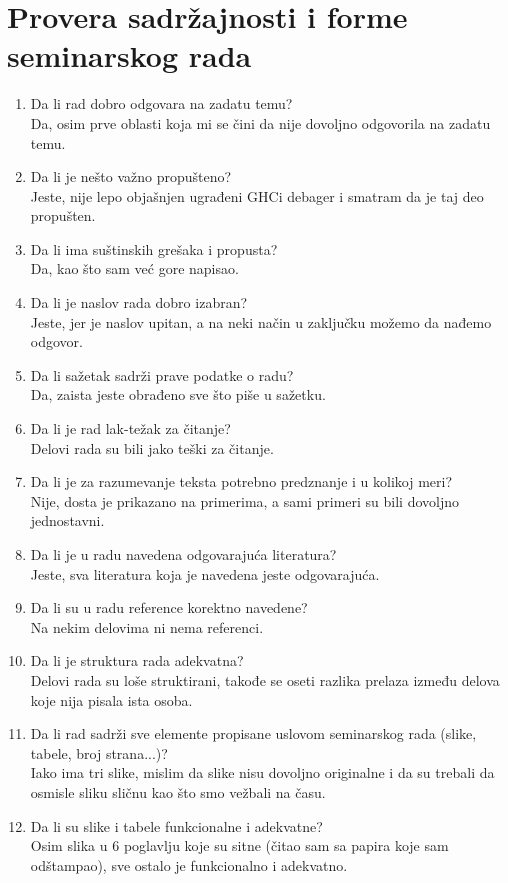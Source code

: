 \documentclass[a4paper]{report}
\begin{document}
\section{Provera sadržajnosti i forme seminarskog rada}

\begin{enumerate}
\item Da li rad dobro odgovara na zadatu temu?\\
Da, osim prve oblasti koja mi se čini da nije dovoljno odgovorila na zadatu temu.
\item Da li je nešto važno propušteno?\\
Jeste, nije lepo objašnjen ugrađeni GHCi debager i smatram da je taj deo propušten.
\item Da li ima suštinskih grešaka i propusta?\\
Da, kao što sam već gore napisao.
\item Da li je naslov rada dobro izabran?\\
Jeste, jer je naslov upitan, a na neki način u zaključku možemo da nađemo odgovor.
\item Da li sažetak sadrži prave podatke o radu?\\
Da, zaista jeste obrađeno sve što piše u sažetku.
\item Da li je rad lak-težak za čitanje?\\
Delovi rada su bili jako teški za čitanje.
\item Da li je za razumevanje teksta potrebno predznanje i u kolikoj meri?\\
Nije, dosta je prikazano na primerima, a sami primeri su bili dovoljno jednostavni.
\item Da li je u radu navedena odgovarajuća literatura?\\
Jeste, sva literatura koja je navedena jeste odgovarajuća.
\item Da li su u radu reference korektno navedene?\\
Na nekim delovima ni nema referenci.
\item Da li je struktura rada adekvatna?\\
Delovi rada su loše struktirani, takođe se oseti razlika prelaza između delova koje nija pisala ista osoba.
\item Da li rad sadrži sve elemente propisane uslovom seminarskog rada (slike, tabele, broj strana...)?\\
Iako ima tri slike, mislim da slike nisu dovoljno originalne i da su trebali da osmisle sliku sličnu kao što smo vežbali na času.
\item Da li su slike i tabele funkcionalne i adekvatne?\\
Osim slika u 6 poglavlju koje su sitne (čitao sam sa papira koje sam odštampao), sve ostalo je funkcionalno i adekvatno.
\end{enumerate}
\end{document}
